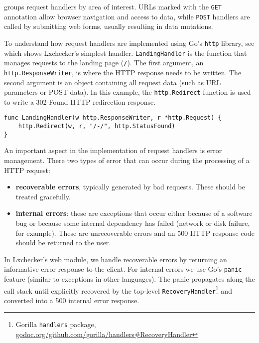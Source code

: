  groups request handlers by area of interest. URLs marked with the \texttt{GET} annotation allow browser navigation and access to data, while \texttt{POST} handlers are called by submitting web forms, usually resulting in data mutations.

To understand how request handlers are implemented using Go's \texttt{http} library, see  which shows Lxchecker's simplest handler. \texttt{LandingHandler} is the function that manages requests to the landing page (\texttt{/}). The first argument, an \texttt{http.ResponseWriter}, is where the HTTP response needs to be written. The second argument is an object containing all request data (such as URL parameters or POST data). In this example, the \texttt{http.Redirect} function is used to write a 302-Found HTTP redirection response.

\lstset{language=Golang,caption=a simple HTTP handler example,label=lst:landing-handler}
\begin{lstlisting}
func LandingHandler(w http.ResponseWriter, r *http.Request) {
	http.Redirect(w, r, "/-/", http.StatusFound)
}
\end{lstlisting}

An important aspect in the implementation of request handlers is error management. There two types of error that can occur during the processing of a HTTP request:
\begin{itemize}
	\item \textbf{recoverable errors}, typically generated by bad requests. These should be treated gracefully.
	\item \textbf{internal errors}: these are exceptions that occur either because of a software bug or because some internal dependency has failed (network or disk failure, for example). These are unrecoverable errors and an 500 HTTP response code should be returned to the user.
\end{itemize}

In Lxchecker's web module, we handle recoverable errors by returning an informative error response to the client. For internal errors we use Go's \texttt{panic} feature (similar to exceptions in other languages). The panic propagates along the call stack until explicitly recovered by the top-level \texttt{RecoveryHandler}\footnote{Gorilla \texttt{handlers} package, \url{godoc.org/github.com/gorilla/handlers\#RecoveryHandler}} and converted into a 500 internal error response.


